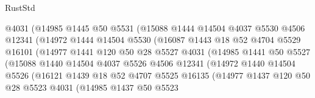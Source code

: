 \begin{lexlean}{RustStd}
\begin{coremodule}
                        @4031
                        (@14985
                          @1445
                          @50
                          @5531
                          (@15088
                            @1444
                            @14504
                            @4037
                            @5530
                            @4506
                            @12341
                            (@14972
                              @1444
                              @14504
                              @5530
                              (@16087
                                @1443
                                @18
                                @52
                                @4704
                                @5529
                                @16101
                                (@14977
                                  @1441
                                  @120
                                  @50
                                  @28
                                  @5527
                                  @4031
                                  (@14985
                                    @1441
                                    @50
                                    @5527
                                    (@15088
                                      @1440
                                      @14504
                                      @4037
                                      @5526
                                      @4506
                                      @12341
                                      (@14972
                                        @1440
                                        @14504
                                        @5526
                                        (@16121
                                          @1439
                                          @18
                                          @52
                                          @4707
                                          @5525
                                          @16135
                                          (@14977
                                            @1437
                                            @120
                                            @50
                                            @28
                                            @5523
                                            @4031
                                            (@14985
                                              @1437
                                              @50
                                              @5523

\end{coremodule}
\end{lexlean}
